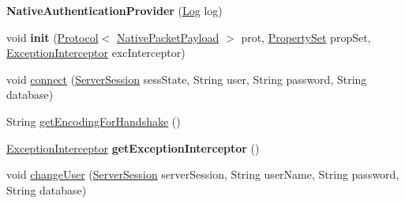 \begin{DoxyCompactItemize}
\item 
\mbox{\label{classcom_1_1mysql_1_1cj_1_1protocol_1_1a_1_1_native_authentication_provider_a3b9853ff4d45808557e5566bdbcd5d5d}} 
{\bfseries Native\+Authentication\+Provider} (\mbox{\hyperlink{interfacecom_1_1mysql_1_1cj_1_1log_1_1_log}{Log}} log)
\item 
\mbox{\label{classcom_1_1mysql_1_1cj_1_1protocol_1_1a_1_1_native_authentication_provider_aad4a7ad192dd22c533e5a4a8190c7776}} 
void {\bfseries init} (\mbox{\hyperlink{interfacecom_1_1mysql_1_1cj_1_1protocol_1_1_protocol}{Protocol}}$<$ \mbox{\hyperlink{classcom_1_1mysql_1_1cj_1_1protocol_1_1a_1_1_native_packet_payload}{Native\+Packet\+Payload}} $>$ prot, \mbox{\hyperlink{interfacecom_1_1mysql_1_1cj_1_1conf_1_1_property_set}{Property\+Set}} prop\+Set, \mbox{\hyperlink{interfacecom_1_1mysql_1_1cj_1_1exceptions_1_1_exception_interceptor}{Exception\+Interceptor}} exc\+Interceptor)
\item 
void \mbox{\hyperlink{classcom_1_1mysql_1_1cj_1_1protocol_1_1a_1_1_native_authentication_provider_a2293502a6ebd37746dcada2f4b0a9c23}{connect}} (\mbox{\hyperlink{interfacecom_1_1mysql_1_1cj_1_1protocol_1_1_server_session}{Server\+Session}} sess\+State, String user, String password, String database)
\item 
String \mbox{\hyperlink{classcom_1_1mysql_1_1cj_1_1protocol_1_1a_1_1_native_authentication_provider_a27c5a8cd7397eb15934b3b3048dc161d}{get\+Encoding\+For\+Handshake}} ()
\item 
\mbox{\label{classcom_1_1mysql_1_1cj_1_1protocol_1_1a_1_1_native_authentication_provider_aed374243b2af096a92fd54eb99300bf0}} 
\mbox{\hyperlink{interfacecom_1_1mysql_1_1cj_1_1exceptions_1_1_exception_interceptor}{Exception\+Interceptor}} {\bfseries get\+Exception\+Interceptor} ()
\item 
void \mbox{\hyperlink{classcom_1_1mysql_1_1cj_1_1protocol_1_1a_1_1_native_authentication_provider_a5cf1296206b1d2ceb53440428a37d6f8}{change\+User}} (\mbox{\hyperlink{interfacecom_1_1mysql_1_1cj_1_1protocol_1_1_server_session}{Server\+Session}} server\+Session, String user\+Name, String password, String database)
\end{DoxyCompactItemize}
